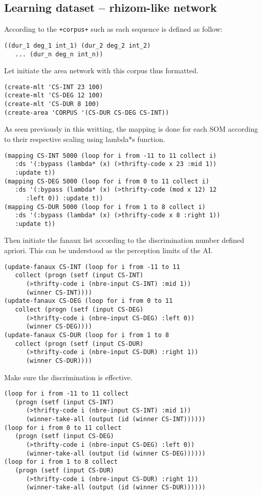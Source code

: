 \subsection{Learning dataset -- rhizom-like network}

\bigskip

\noindent According to the \texttt{+corpus+} such as each sequence is defined as follow:
\begin{lstlisting}[language=N3]
((dur_1 deg_1 int_1) (dur_2 deg_2 int_2) 
   ... (dur_n deg_n int_n))
\end{lstlisting}
 Let initiate the area network with this corpus thus formatted.
\begin{lstlisting}[language=N3]
(create-mlt 'CS-INT 23 100)
(create-mlt 'CS-DEG 12 100)
(create-mlt 'CS-DUR 8 100)
(create-area 'CORPUS '(CS-DUR CS-DEG CS-INT))
\end{lstlisting}
As seen previously in this writting, the mapping is done for each SOM according to their respective scaling using \glspl{lambda*} function.
\begin{lstlisting}[language=N3]
(mapping CS-INT 5000 (loop for i from -11 to 11 collect i) 
   :ds '(:bypass (lambda* (x) (>thrifty-code x 23 :mid 1)) 
   :update t))
(mapping CS-DEG 5000 (loop for i from 0 to 11 collect i) 
   :ds '(:bypass (lambda* (x) (>thrifty-code (mod x 12) 12 
      :left 0)) :update t))
(mapping CS-DUR 5000 (loop for i from 1 to 8 collect i) 
   :ds '(:bypass (lambda* (x) (>thrifty-code x 8 :right 1)) 
   :update t))
\end{lstlisting}
Then initiate the fanaux list according to the discrimination number defined apriori. This can be understood as the perception limits of the AI. 
\begin{lstlisting}[language=N3]
(update-fanaux CS-INT (loop for i from -11 to 11 
   collect (progn (setf (input CS-INT) 
      (>thrifty-code i (nbre-input CS-INT) :mid 1)) 
      (winner CS-INT))))
(update-fanaux CS-DEG (loop for i from 0 to 11 
   collect (progn (setf (input CS-DEG) 
      (>thrifty-code i (nbre-input CS-DEG) :left 0)) 
      (winner CS-DEG))))
(update-fanaux CS-DUR (loop for i from 1 to 8 
   collect (progn (setf (input CS-DUR) 
      (>thrifty-code i (nbre-input CS-DUR) :right 1)) 
      (winner CS-DUR))))
\end{lstlisting}
Make sure the discrimination is effective. 
\begin{lstlisting}[language=N3]
(loop for i from -11 to 11 collect 
   (progn (setf (input CS-INT) 
      (>thrifty-code i (nbre-input CS-INT) :mid 1)) 
      (winner-take-all (output (id (winner CS-INT))))))
(loop for i from 0 to 11 collect 
   (progn (setf (input CS-DEG) 
      (>thrifty-code i (nbre-input CS-DEG) :left 0)) 
      (winner-take-all (output (id (winner CS-DEG))))))
(loop for i from 1 to 8 collect 
   (progn (setf (input CS-DUR) 
      (>thrifty-code i (nbre-input CS-DUR) :right 1)) 
      (winner-take-all (output (id (winner CS-DUR))))))
\end{lstlisting}
